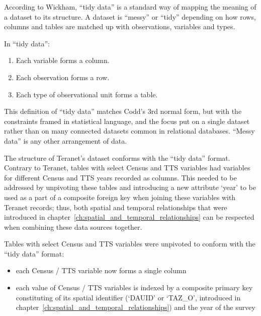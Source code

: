 According to Wickham\cite{Wickham2014}, ``tidy data'' is a standard way of mapping the meaning of a dataset to its structure.
A dataset is ``messy'' or ``tidy'' depending on how rows, columns and tables are matched up with observations, variables and types.

\vspace{5mm}

In ``tidy data'':
\begin{enumerate}
    \item Each variable forms a column.
    \item Each observation forms a row.
    \item Each type of observational unit forms a table.
\end{enumerate}

This definition of ``tidy data'' matches Codd's 3rd normal form\cite{Codd1990}, but with the constraints framed in statistical language, and the focus put on a single dataset rather than on many connected datasets common in relational databases.
``Messy data'' is any other arrangement of data.

\vspace{5mm}

The structure of Teranet's dataset conforms with the ``tidy data'' format.
Contrary to Teranet, tables with select Census and TTS variables had variables for different Census and TTS years recorded as columns.
This needed to be addressed by unpivoting these tables and introducing a new attribute `year' to be used as a part of a composite foreign key when joining these variables with Teranet records;
thus, both spatial and temporal relationships that were introduced in chapter~\ref{ch:spatial_and_temporal_relationships} can be respected when combining these data sources together.

\vspace{5mm}

Tables with select Census and TTS variables were unpivoted to conform with the ``tidy data'' format:
\begin{itemize}
    \item each Census / TTS variable now forms a single column
    \item each value of Census / TTS variables is indexed by a composite primary key constituting of its spatial identifier (`DAUID' or `TAZ\_O', introduced in chapter~\ref{ch:spatial_and_temporal_relationships}) and the year of the survey
\end{itemize}

